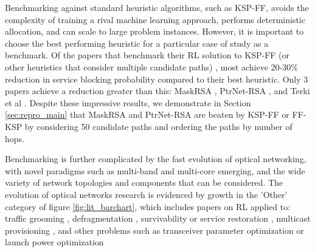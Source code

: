 Benchmarking against standard heuristic algorithms, such as KSP-FF, avoids the complexity of training a rival machine learning approach, performs deterministic allocation, and can scale to large problem instances. However, it is important to choose the best performing heuristic for a particular case of study as a benchmark. Of the papers that benchmark their RL solution to KSP-FF (or other heuristics that consider multiple candidate paths) \cite{chen_deeprmsa_2019,chen_multi-task-learning-based_2021,shi_deep-reinforced_2021,shimoda_deep_2021,xu_spectrum_2021,zhao_reinforced_2021,zhao_service_2021,shimoda_mask_2021,quang_magc-rsa_2022,tu_entropy-based_2022,tang_heuristic_2022,xu_deep_2022,cheng_routing_2022,nevin_techniques_2022,tang_deep_2022,di_cicco_deep_2022,terki_routing_2023,sadeghi_performance_2023,tanaka_adaptive_2023,tang_routing_2023,xu_hierarchical_2023,errea_deep_2023,hernandez-chulde_experimental_2023,cheng_ptrnet-rsa_2024,fan_blocking-driven_2023}, most achieve 20-30\% reduction in service blocking probability compared to their best heuristic. Only 3 papers achieve a reduction greater than this: MaskRSA \cite{shimoda_mask_2021}, PtrNet-RSA \cite{cheng_ptrnet-rsa_2024}, and Terki et al \cite{terki_routing_2022}. Despite these impressive results, we demonstrate in Section \ref{sec:repro_main} that MaskRSA and PtrNet-RSA are beaten by KSP-FF or FF-KSP by considering 50 candidate paths and ordering the paths by number of hops\footnotemark.


Benchmarking is further complicated by the fast evolution of optical networking, with novel paradigms such as multi-band \cite{beghelli_approaches_2023} and multi-core \cite{pinto-rios_resource_2023} emerging, and the wide variety of network topologies \cite{matzner_topology_2024} and components that can be considered. The evolution of optical networks research is evidenced by growth in the 'Other' category of figure \ref{fig:lit_barchart}, which includes papers on RL applied to: traffic grooming \cite{tanaka_reinforcement-learning-based_2022,zhang_admire_2023,tanaka_adaptive_2023,tanaka_reinforcement-learning-based_2024}, defragmentation \cite{etezadi_deepdefrag_2022,fan_blocking-driven_2023,johari_drl-assisted_2023,etezadi_deep_2023}, survivability or service restoration \cite{zhao_reinforcement-learning-based_2019,luo_leveraging_2019,zhao_service_2021,hernandez-chulde_evaluation_2022,zhao_rsa_2022,luo_survivable_2022,jiao_reliability-oriented_2022}, multicast provisioning \cite{garcia_multicast_2003,tian_reconfiguring_2021,li_tabdeep_2024}, %
and other problems such as transceiver parameter optimization \cite{weixer_reinforcement_2020,koch_reinforcement_2022,koch_high-generalizability_2022} or launch power optimization \cite{tse_reinforcement_2024}

